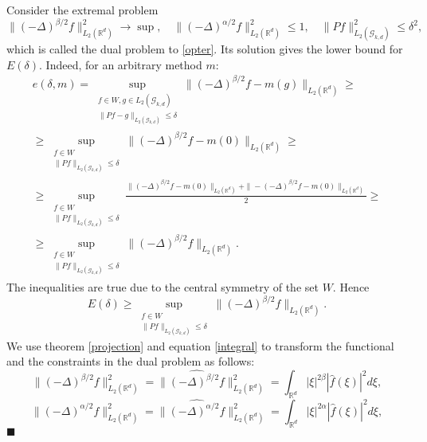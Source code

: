 \documentclass[12pt]{iopart}
\newenvironment{proof}
{\par\noindent{\bf Proof}}
{\hfill$\scriptstyle\blacksquare$}
\begin{document}
\begin{proof}
Consider the extremal problem
\[
  \|(-\Delta)^{\beta/2}f\|^2_{L_2(\mathbb R^d)}\to\sup,\quad \|
  (-\Delta)^{\alpha/2}f\|^2_{L_2(\mathbb R^d)}\leqslant  1,\quad
  \|Pf\|^2_{L_2(\mathcal G_{k,d})}\leqslant  \delta^2,
\] which is called the dual problem to \eqref{opter}.
Its solution gives the lower bound for $E(\delta)$. Indeed, for an arbitrary method $m$:
\begin{multline*}
e(\delta,m)= \sup_{
\begin{smallmatrix}
f\in W, g\in L_2(\mathcal G_{k,d})\\ 
\|Pf-g\|_{L_2(\mathcal G_{k,d})}\leqslant \delta
\end{smallmatrix}}
\|(-\Delta)^{\beta/2}f-m(g)\|_{L_2(\mathbb{R}^d)}\geqslant\\
\geqslant\sup_{
\begin{smallmatrix}
f\in W\\ 
\|Pf\|_{L_2(\mathcal G_{k,d})}\leqslant \delta
\end{smallmatrix}}
\|(-\Delta)^{\beta/2}f-m(0)\|_{L_2(\mathbb{R}^d)}\geqslant \\
\geqslant \sup_{
\begin{smallmatrix}
f\in W\\ 
\|Pf\|_{L_2(\mathcal G_{k,d})}\leqslant \delta
\end{smallmatrix}}
\frac{\|(-\Delta)^{\beta/2}f-m(0)\|_{L_2(\mathbb{R}^d)}+\|-(-\Delta)^{\beta/2}f-m(0)\|_{L_2(\mathbb{R}^d)}}{2}\geqslant \\
\geqslant\sup_{
\begin{smallmatrix}
f\in W\\ 
\|Pf\|_{L_2(\mathcal G_{k,d})}\leqslant \delta
\end{smallmatrix}}
\|(-\Delta)^{\beta/2}f\|_{L_2(\mathbb{R}^d)}.
\end{multline*}
The inequalities are true due to the central symmetry of the set $W$. Hence
$$E(\delta)\geqslant\sup_{
\begin{smallmatrix}
f\in W\\ 
\|Pf\|_{L_2(\mathcal G_{k,d})}\leqslant \delta
\end{smallmatrix}}
\|(-\Delta)^{\beta/2}f\|_{L_2(\mathbb{R}^d)}.$$
We use theorem \ref{projection} and equation \eqref{integral} to transform the functional and the constraints in the dual problem as follows: 
\[
  \|(-\Delta)^{\beta/2}f\|^2_{L_2(\mathbb R^d)}=\|\widehat{(-\Delta)^{\beta/2}f}\|^2_{L_2(\mathbb R^d)}=\int_{\mathbb R^d}|\xi|^{2\beta}|\widehat{f}(\xi )|^2d\xi,
\]
\[ \| (-\Delta)^{\alpha/2}f\|^2_{L_2(\mathbb R^d)}=\|\widehat{(-\Delta)^{\alpha/2}f}\|^2_{L_2(\mathbb R^d)}=\int_{\mathbb R^d}|\xi|^{2\alpha} |\widehat{f}(\xi)|^2d\xi,
\]
\end{proof}
\end{document}
